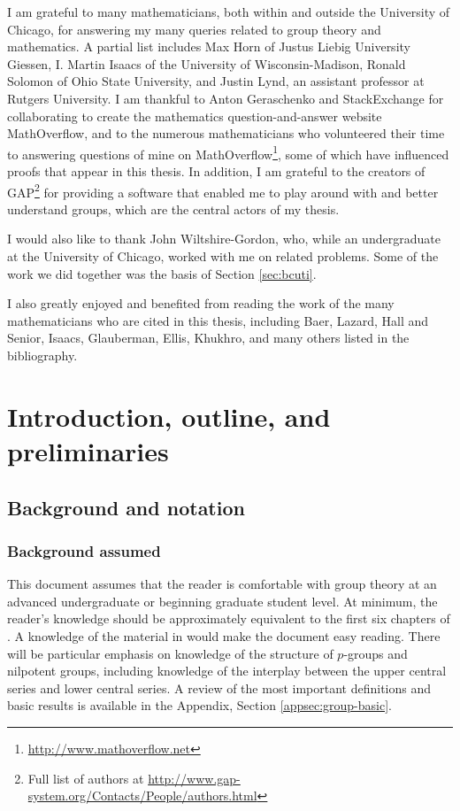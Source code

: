 \documentclass{ucetd}
\begin{document}
I am grateful to many mathematicians, both within and outside the
University of Chicago, for answering my many queries related to group
theory and mathematics. A partial list includes Max Horn of Justus
Liebig University Giessen, I. Martin Isaacs of the University of
Wisconsin-Madison, Ronald Solomon of Ohio State University, and Justin
Lynd, an assistant professor at Rutgers University. I am thankful to
Anton Geraschenko and StackExchange for collaborating to create the
mathematics question-and-answer website MathOverflow, and to the
numerous mathematicians who volunteered their time to answering
questions of mine on
MathOverflow\footnote{\url{http://www.mathoverflow.net}}, some of
which have influenced proofs that appear in this thesis. In addition,
I am grateful to the creators of GAP\footnote{Full list of authors at
  \url{http://www.gap-system.org/Contacts/People/authors.html}} for
providing a software that enabled me to play around with and better
understand groups, which are the central actors of my thesis.

I would also like to thank John Wiltshire-Gordon, who, while an
undergraduate at the University of Chicago, worked with me on related
problems. Some of the work we did together was the basis of Section
\ref{sec:bcuti}.

I also greatly enjoyed and benefited from reading the work of the many
mathematicians who are cited in this thesis, including Baer, Lazard,
Hall and Senior, Isaacs, Glauberman, Ellis, Khukhro, and many others
listed in the bibliography.

\mainmatter

\chapter{Introduction, outline, and preliminaries}

\section*{Background and notation}

\subsection{Background assumed}

This document assumes that the reader is comfortable with group theory
at an advanced undergraduate or beginning graduate student level. At
minimum, the reader's knowledge should be approximately equivalent to
the first six chapters of \cite{DummitFoote}. A knowledge of the
material in \cite{RotmanGT} would make the document easy
reading. There will be particular emphasis on knowledge of the
structure of $p$-groups and nilpotent groups, including knowledge of
the interplay between the upper central series and lower central
series. A review of the most important definitions and basic results
is available in the Appendix, Section \ref{appsec:group-basic}.
\end{document}
